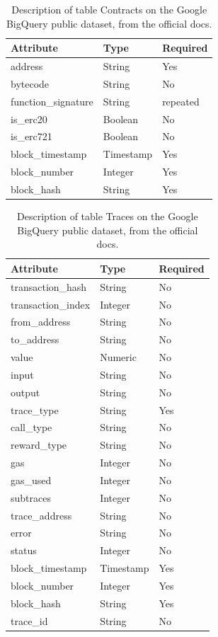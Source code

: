 \begin{table}[H]
\centering
    \begin{tabular}  { m{6cm} m{3cm} m{3cm} } 
    \toprule
    \textbf{Attribute} & \textbf{Type} & \textbf{Required} \\
    \midrule
    address & String & Yes \\
    bytecode & String & No \\
    function\_signature & String & repeated \\
    is\_erc20 & Boolean & No \\
    is\_erc721 & Boolean & No \\
    block\_timestamp & Timestamp & Yes \\
    block\_number & Integer & Yes \\
    block\_hash & String & Yes \\
    \bottomrule
\end{tabular}
\caption[Google BigQuery \texttt{Contracts} table]{Description of table Contracts on the Google BigQuery public dataset, from the official docs.}
\label{table:bigquery-contracts}
\end{table}

\begin{table}[H]
\centering
    \begin{tabular}  { m{6cm} m{3cm} m{3cm} } 
    \toprule
    \textbf{Attribute} & \textbf{Type} & \textbf{Required} \\
    \midrule
    transaction\_hash & String &	No	\\			
    transaction\_index & Integer	& No	\\			
    from\_address & String &	No \\	
    to\_address & String & No \\				
    value & Numeric &	No		\\		
    input & String &	No		\\		
    output & String	& No		\\		
    trace\_type & String &	Yes		\\		
    call\_type & String	& No	\\
    reward\_type & String	& No\\
    gas & Integer	& No\\
    gas\_used & Integer	& No\\
    subtraces & Integer	& No\\
    trace\_address & String	& No		\\
    error & String	& No		\\
    status & Integer	& No	\\		
    block\_timestamp & Timestamp	& Yes		\\		
    block\_number & Integer	& Yes			\\	
    block\_hash & String	& Yes	\\			
    trace\_id & String	& No \\
    \bottomrule
\end{tabular}
\caption[Google BigQuery \texttt{Traces} table]{Description of table Traces on the Google BigQuery public dataset, from the official docs.}
\label{table:bigquery-traces}
\end{table}

